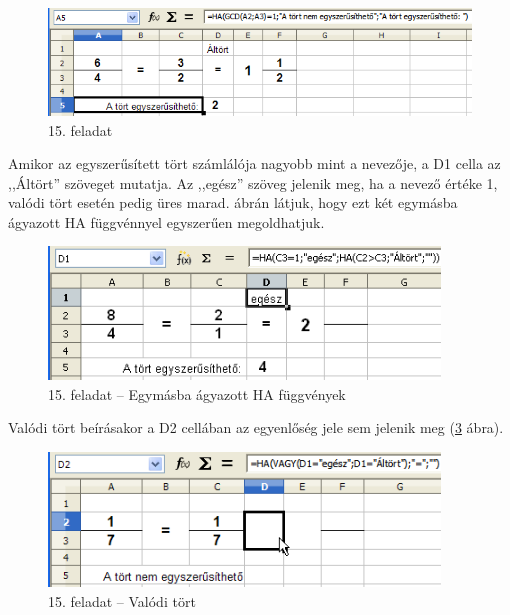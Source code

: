 \begin{figure}[!h]
\begin{center}
\includegraphics[width=13.873cm]{oocalcv2-img84.png}
\caption{15. feladat}\label{15-feladat}
\end{center}
\end{figure}

Amikor az egyszerűsített tört számlálója nagyobb mint a
nevezője, a D1 cella az ,,Áltört'' szöveget mutatja. Az
,,egész'' szöveg jelenik meg, ha a nevező értéke 1, valódi
tört esetén pedig üres marad.   ábrán
látjuk, hogy ezt két egymásba ágyazott HA
függvénnyel egyszerűen megoldhatjuk.

\begin{figure}[!h]
\begin{center}
\includegraphics[width=10.404cm]{oocalcv2-img85.png}
\caption{15. feladat -- Egymásba ágyazott HA függvények}\label{15-feladatIFek}
\end{center}
\end{figure}

Valódi tört beírásakor a D2 cellában az egyenlőség jele
sem jelenik meg (\ref{15-feladatValódi} ábra).

\begin{figure}[!h]
\begin{center}
\includegraphics[width=10.402cm]{oocalcv2-img86.png}
\caption{15. feladat -- Valódi tört}\label{15-feladatValódi}
\end{center}
\end{figure}

